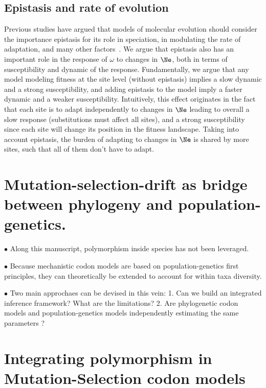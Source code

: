 \subsection{Epistasis and rate of evolution}

Previous studies have argued that models of molecular evolution should consider the importance epistasis for its role in speciation, in modulating the rate of adaptation, and many other factors~\citep{Goldstein2017, Miller2018}.
We argue that epistasis also has an important role in the response of $\omega$ to changes in $\Ne$, both in terms of susceptibility and dynamic of the response.
Fundamentally, we argue that any model modeling fitness at the site level (without epistasis) implies a slow dynamic and a strong susceptibility, and adding epistasis to the model imply a faster dynamic and a weaker susceptibility.
Intuitively, this effect originates in the fact that each site is to adapt independently to changes in $\Ne$ leading to overall a slow response (substitutions must affect all sites), and a strong susceptibility since each site will change its position in the fitness landscape.
Taking into account epistasis, the burden of adapting to changes in $\Ne$ is shared by more sites, such that all of them don't have to adapt.


\section{Mutation-selection-drift as bridge between phylogeny and population-genetics.}

$\bullet$ Along this manuscript, polymorphism inside species has not been leveraged.

$\bullet$ Because mechanistic codon models are based on population-genetics first principles, they can theoretically be extended to account for within taxa diversity.

$\bullet$ Two main approchaes can be devised in this vein:
1. Can we build an integrated inference framework? What are the limitations?
2. Are phylogenetic codon models and population-genetics models independently estimating the same parameters ?

\section{Integrating polymorphism in Mutation-Selection codon models}

